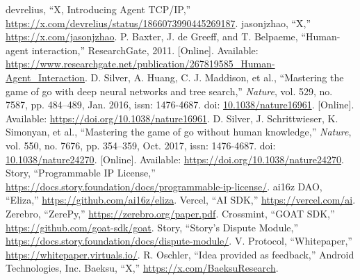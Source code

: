 \documentclass[journal,onecolumn]{IEEEtran} %
\begin{document}

\begin{thebibliography}{99}
     devrelius, “X, Introducing Agent TCP/IP,” \url{https://x.com/devrelius/status/1866073990445269187}.
     jasonjzhao, “X,” \url{https://x.com/jasonjzhao}.
     P. Baxter, J. de Greeff, and T. Belpaeme, “Human-agent interaction,” ResearchGate, 2011. [Online]. Available: \url{https://www.researchgate.net/publication/267819585_Human-Agent_Interaction}.
     D. Silver, A. Huang, C. J. Maddison, et al., “Mastering the game of go with deep neural networks and tree search,” \textit{Nature}, vol. 529, no. 7587, pp. 484–489, Jan. 2016, issn: 1476-4687. doi: \url{10.1038/nature16961}. [Online]. Available: \url{https://doi.org/10.1038/nature16961}.
     D. Silver, J. Schrittwieser, K. Simonyan, et al., “Mastering the game of go without human knowledge,” \textit{Nature}, vol. 550, no. 7676, pp. 354–359, Oct. 2017, issn: 1476-4687. doi: \url{10.1038/nature24270}. [Online]. Available: \url{https://doi.org/10.1038/nature24270}.
     Story, “Programmable IP License,” \url{https://docs.story.foundation/docs/programmable-ip-license/}.
     ai16z DAO, “Eliza,” \url{https://github.com/ai16z/eliza}.
     Vercel, “AI SDK,” \url{https://vercel.com/ai}.
     Zerebro, “ZerePy,” \url{https://zerebro.org/paper.pdf}.
     Crossmint, “GOAT SDK,” \url{https://github.com/goat-sdk/goat}.
     Story, “Story’s Dispute Module,” \url{https://docs.story.foundation/docs/dispute-module/}.
     V. Protocol, “Whitepaper,” \url{https://whitepaper.virtuals.io/}.
     R. Oschler, “Idea provided as feedback,” Android Technologies, Inc.
     Baeksu, “X,” \url{https://x.com/BaeksuResearch}.
\end{thebibliography}
    
\end{document}
